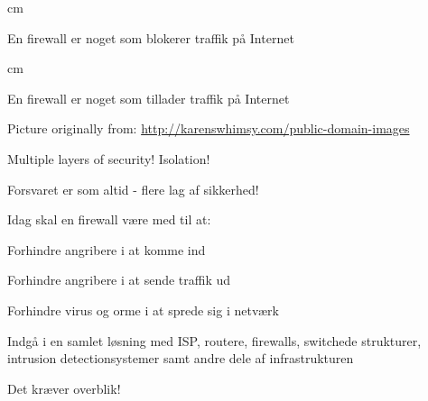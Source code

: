 \documentclass[Screen16to9,17pt]{foils}
\begin{document}

 cm
\centerline{\hlkbig En firewall er noget som {\color{security6blue}blokerer}
  traffik på Internet}

 cm
\pause

\centerline{\hlkbig En firewall er noget som {\color{red}tillader}
  traffik på Internet}


\centerline{Picture originally from: \url{http://karenswhimsy.com/public-domain-images}}



\centerline{\hlkbig\color{security6blue} Multiple layers of security! Isolation!}







\centerline{\hlkbig Forsvaret er som altid - flere lag af sikkerhed! }





\begin{list1}
\item Idag skal en firewall være med til at:
\begin{list2}
\item Forhindre angribere i at komme ind
\item Forhindre angribere i at sende traffik ud
\item Forhindre virus og orme i at sprede sig i netværk
\item Indgå i en samlet løsning med ISP, routere, firewalls, switchede
  strukturer, intrusion detectionsystemer samt andre dele af infrastrukturen
\end{list2}
\item Det kræver overblik!
\end{list1}



\end{document}

